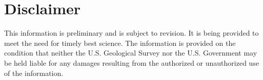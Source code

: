 \documentclass[a4paper,11pt]{article}\usepackage[]{graphicx}\usepackage[]{color}
\begin{document}
\clearpage

\section{Disclaimer}
This information is preliminary and is subject to revision. It is being provided to meet the need for timely best science. The information is provided on the condition that neither the U.S. Geological Survey nor the U.S. Government may be held liable for any damages resulting from the authorized or unauthorized use of the information.
\end{document}
